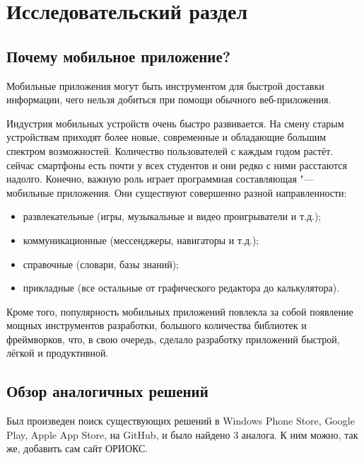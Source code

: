 \chapter{Исследовательский раздел}
\label{ch:research}
%
%

\section{Почему мобильное приложение?}
\label{sec:whyApp}

Мобильные приложения могут быть инструментом для быстрой доставки информации, чего нельзя добиться при помощи обычного веб-приложения.

Индустрия мобильных устройств очень быстро развивается.
На смену старым устройствам приходят более новые, современные и обладающие большим спектром возможностей.
Количество пользователей с каждым годом растёт.
сейчас смартфоны есть почти у всех студентов и они редко с ними расстаются надолго.
Конечно, важную роль играет программная составляющая "--- мобильные приложения.
Они существуют совершенно разной направленности:
\begin{itemize}
  \item развлекательные (игры, музыкальные и видео проигрыватели и т.д.);
  \item коммуникационные (мессенджеры, навигаторы и т.д.);
  \item справочные (словари, базы знаний);
  \item прикладные (все остальные от графического редактора до калькулятора).
\end{itemize}

Кроме того, популярность мобильных приложений повлекла за собой появление мощных инструментов разработки, большого количества библиотек и фреймворков, что, в свою очередь, сделало разработку приложений быстрой, лёгкой и продуктивной.


\section{Обзор аналогичных решений}
\label{sec:analogs}
Был произведен поиск существующих решений в Windows Phone Store, Google Play, Apple App Store, на GitHub, и было найдено 3 аналога.
К ним можно, так же, добавить сам сайт ОРИОКС.

